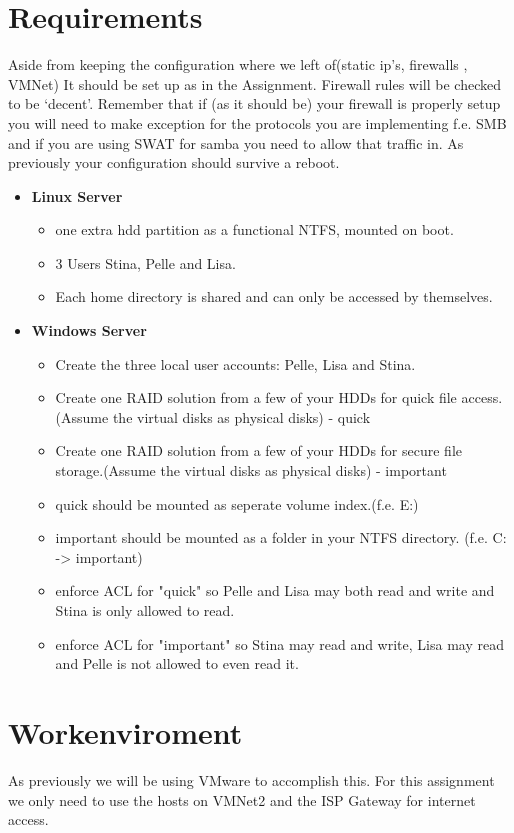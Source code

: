 \documentclass[paper=a4, fontsize=11pt]{report} %
\begin{document}
\section{Requirements}
\label{tasks}
Aside from keeping the configuration where we left of(static ip's, firewalls , VMNet) It should be set up as in the Assignment. Firewall rules will be checked to be ‘decent’. Remember that if (as it should be) your firewall is properly setup you will need to make exception for the protocols you are implementing f.e. SMB and if you are using SWAT for samba you need to allow that traffic in.
As previously your configuration should survive a reboot.

\begin{itemize}
	\item \textbf{Linux Server}
    \begin{itemize}
		\item one extra hdd partition as a functional NTFS, mounted on boot.
		\item 3 Users Stina, Pelle and Lisa.
		\item Each home directory is shared and can only be accessed by themselves.
	\end{itemize}
	\item \textbf{Windows Server}
	\begin{itemize}
		\item Create the three local user accounts: Pelle, Lisa and Stina.
		\item Create one RAID solution from a few of your HDDs for quick file access.(Assume the virtual disks as physical disks) - quick
		\item Create one RAID solution from a few of your HDDs for secure file storage.(Assume the virtual disks as physical disks) - important
		\item quick should be mounted as seperate volume index.(f.e. E:)
		\item important should be mounted as a folder in your NTFS directory. (f.e. C: -> important)
		\item enforce ACL for "quick" so Pelle and Lisa may both read and write and Stina is only allowed to read.
		\item enforce ACL for "important" so Stina may read and write, Lisa may read and Pelle is not allowed to even read it.
	\end{itemize}
\end{itemize}

\section{Workenviroment}
\label{enviroment}

	As previously we will be using VMware to accomplish this. For this assignment we only need to use the hosts on VMNet2 and the ISP Gateway for internet access.
\end{document}
